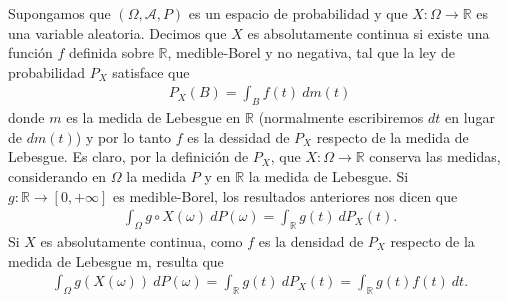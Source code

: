 \begin{ejemplo}
    Supongamos que $(\Omega, \mathcal{A}, P)$ es un espacio de probabilidad y que $X: \Omega \longrightarrow \mathbb{R}$ es una variable aleatoria. Decimos que $X$ es absolutamente continua si existe una función $f$ definida sobre $\mathbb{R}$, medible-Borel y no negativa, tal que la ley de probabilidad $P_X$ satisface que
    \begin{align*}
        P_X(B) = \int_{B}{f(t) \ dm(t)}
    \end{align*}
    donde $m$ es la medida de Lebesgue en $\mathbb{R}$ (normalmente escribiremos $dt$ en lugar de $dm(t)$) y por lo tanto $f$ es la dessidad de $P_X$ respecto de la medida de Lebesgue. Es claro, por la definición de $P_X$, que $X: \Omega \longrightarrow \mathbb{R}$ conserva las medidas, considerando en $\Omega$ la medida $P$ y en $\mathbb{R}$ la medida de Lebesgue. Si $g: \mathbb{R} \longrightarrow [0,+\infty]$ es medible-Borel, los resultados anteriores nos dicen que
    \begin{align*}
        \int_{\Omega}{g \circ X(\omega) \ dP(\omega)} = \int_{\mathbb{R}}{g(t) \ dP_X(t)}.
    \end{align*}
    Si $X$ es absolutamente continua, como $f$ es la densidad de $P_X$ respecto de la medida de Lebesgue m, resulta que
    \begin{align*}
        \int_{\Omega}{g(X(\omega)) \ dP(\omega)} = \int_{\mathbb{R}}{g(t) \ dP_X(t)} = \int_{\mathbb{R}}{g(t)f(t) \ dt}.
    \end{align*}
\end{ejemplo}

